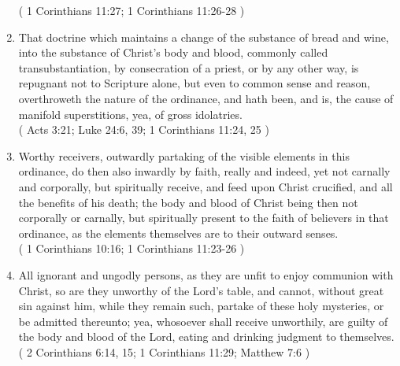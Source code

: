 \documentclass[12pt,a4paper]{book}
\begin{document}
\begin{enumerate}
( 1 Corinthians 11:27; 1 Corinthians 11:26-28 )
\item That doctrine which maintains a change of the substance of bread and wine, into the substance of Christ's body and blood, commonly called transubstantiation, by consecration of a priest, or by any other way, is repugnant not to Scripture alone, but even to common sense and reason, overthroweth the nature of the ordinance, and hath been, and is, the cause of manifold superstitions, yea, of gross idolatries.\\
( Acts 3:21; Luke 24:6, 39; 1 Corinthians 11:24, 25 )
\item Worthy receivers, outwardly partaking of the visible elements in this ordinance, do then also inwardly by faith, really and indeed, yet not carnally and corporally, but spiritually receive, and feed upon Christ crucified, and all the benefits of his death; the body and blood of Christ being then not corporally or carnally, but spiritually present to the faith of believers in that ordinance, as the elements themselves are to their outward senses.\\
( 1 Corinthians 10:16; 1 Corinthians 11:23-26 )
\item All ignorant and ungodly persons, as they are unfit to enjoy communion with Christ, so are they unworthy of the Lord's table, and cannot, without great sin against him, while they remain such, partake of these holy mysteries, or be admitted thereunto; yea, whosoever shall receive unworthily, are guilty of the body and blood of the Lord, eating and drinking judgment to themselves.\\
( 2 Corinthians 6:14, 15; 1 Corinthians 11:29; Matthew 7:6 )
\end{enumerate}
\end{document}
